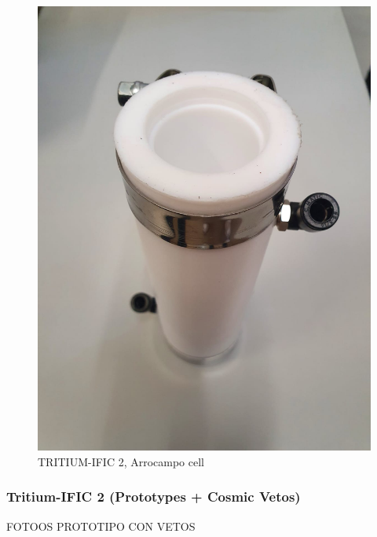 \documentclass{beamer}
\begin{document}
\begin{frame}
\begin{multicols}{2}
\begin{figure}[hbtp]
\centering
\includegraphics[scale=0.1]{Imagenes/1Tritium_detector/Tritium_Arrocampo_Prototype.jpeg}
\caption{TRITIUM-IFIC 2, Arrocampo cell}
\end{figure}

\end{multicols}

\end{frame}

\begin{frame}
\frametitle{Tritium-IFIC 2 (Prototypes + Cosmic Vetos)}

FOTOOS PROTOTIPO CON VETOS

\end{frame}
\end{document}
